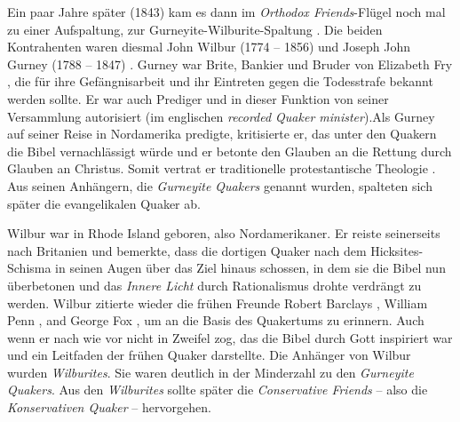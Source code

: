 Ein paar Jahre später (1843) kam es dann im \textit{Orthodox Friends}-Flügel
noch mal zu einer Aufspaltung, zur Gurneyite-Wilburite-Spaltung
. Die beiden
Kontrahenten waren diesmal John Wilbur (1774 -- 1856)  und Joseph John Gurney
(1788 -- 1847) . Gurney war Brite, Bankier
 und Bruder von Elizabeth Fry , die für
ihre Gefängnisarbeit  und ihr Eintreten gegen
die Todesstrafe  bekannt werden
sollte. Er war auch Prediger  und in dieser Funktion
von seiner
Versammlung autorisiert (im englischen \textit{recorded Quaker minister}).Als
Gurney auf seiner Reise in Nordamerika predigte, kritisierte er, das unter den
Quakern die Bibel  vernachlässigt würde und er betonte den Glauben
an die
Rettung durch Glauben an Christus. Somit vertrat er traditionelle
protestantische Theologie . Aus seinen
Anhängern, die \textit{Gurneyite Quakers}
genannt wurden, spalteten sich später die evangelikalen Quaker
 ab.

\medskip

Wilbur war in Rhode Island  geboren, also
Nordamerikaner. Er reiste seinerseits
nach Britanien und bemerkte, dass die dortigen Quaker nach dem Hicksites-Schisma
in seinen Augen über das Ziel hinaus schossen, in dem sie die Bibel nun
überbetonen und das \textit{Innere Licht} durch Rationalismus drohte verdrängt
zu werden. Wilbur zitierte wieder die frühen Freunde Robert Barclays
, William
Penn , and George Fox , um an die Basis des Quakertums zu erinnern. Auch wenn er
nach wie vor nicht in Zweifel zog, das die Bibel durch Gott inspiriert war und
ein Leitfaden der frühen Quaker darstellte. Die Anhänger von Wilbur wurden
\textit{Wilburites}. Sie waren deutlich in der Minderzahl zu den
\textit{Gurneyite Quakers}. Aus den \textit{Wilburites} sollte später die
\textit{Conservative Friends}  -- also die
\textit{Konservativen Quaker} --
hervorgehen.

\medskip

